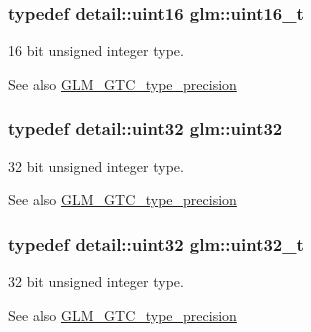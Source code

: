 \subsubsection[{uint16\+\_\+t}]{\setlength{\rightskip}{0pt plus 5cm}typedef detail\+::uint16 {\bf glm\+::uint16\+\_\+t}}\label{group__gtc__type__precision_gac4eb4f43cae8129b00086dc234d3b8fc}
16 bit unsigned integer type. \begin{DoxySeeAlso}{See also}
\hyperlink{group__gtc__type__precision}{G\+L\+M\+\_\+\+G\+T\+C\+\_\+type\+\_\+precision} 
\end{DoxySeeAlso}
\hypertarget{group__gtc__type__precision_ga202b6a53c105fcb7e531f9b443518451}{}
\subsubsection[{uint32}]{\setlength{\rightskip}{0pt plus 5cm}typedef detail\+::uint32 {\bf glm\+::uint32}}\label{group__gtc__type__precision_ga202b6a53c105fcb7e531f9b443518451}
32 bit unsigned integer type. \begin{DoxySeeAlso}{See also}
\hyperlink{group__gtc__type__precision}{G\+L\+M\+\_\+\+G\+T\+C\+\_\+type\+\_\+precision} 
\end{DoxySeeAlso}
\hypertarget{group__gtc__type__precision_ga822ca53a9ad412504532838906276a99}{}
\subsubsection[{uint32\+\_\+t}]{\setlength{\rightskip}{0pt plus 5cm}typedef detail\+::uint32 {\bf glm\+::uint32\+\_\+t}}\label{group__gtc__type__precision_ga822ca53a9ad412504532838906276a99}
32 bit unsigned integer type. \begin{DoxySeeAlso}{See also}
\hyperlink{group__gtc__type__precision}{G\+L\+M\+\_\+\+G\+T\+C\+\_\+type\+\_\+precision} 
\end{DoxySeeAlso}
\hypertarget{group__gtc__type__precision_gae3632bf9b37da66233d78930dd06378a}{}
